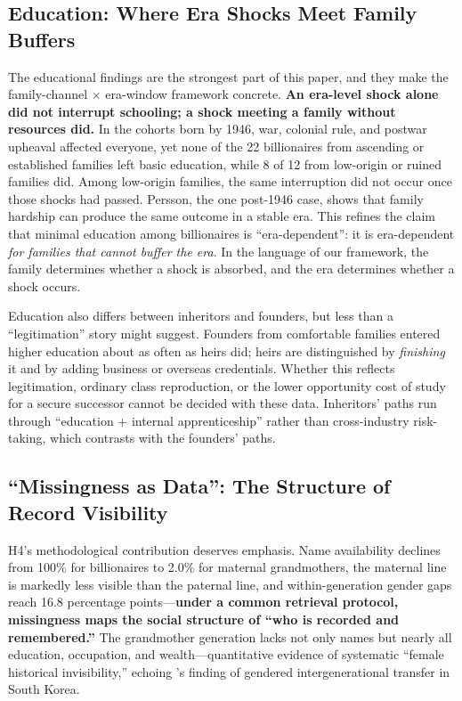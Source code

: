 \documentclass[11pt,a4paper]{article}
\begin{document}
\subsection{Education: Where Era Shocks Meet Family Buffers}

The educational findings are the strongest part of this paper, and they make the family-channel $\times$ era-window framework concrete. \textbf{An era-level shock alone did not interrupt schooling; a shock meeting a family without resources did.} In the cohorts born by 1946, war, colonial rule, and postwar upheaval affected everyone, yet none of the 22 billionaires from ascending or established families left basic education, while 8 of 12 from low-origin or ruined families did. Among low-origin families, the same interruption did not occur once those shocks had passed. Persson, the one post-1946 case, shows that family hardship can produce the same outcome in a stable era. This refines the claim that minimal education among billionaires is ``era-dependent'': it is era-dependent \emph{for families that cannot buffer the era}. In the language of our framework, the family determines whether a shock is absorbed, and the era determines whether a shock occurs.

Education also differs between inheritors and founders, but less than a ``legitimation'' story might suggest. Founders from comfortable families entered higher education about as often as heirs did; heirs are distinguished by \emph{finishing} it and by adding business or overseas credentials. Whether this reflects legitimation, ordinary class reproduction, or the lower opportunity cost of study for a secure successor cannot be decided with these data. Inheritors' paths run through ``education + internal apprenticeship'' rather than cross-industry risk-taking, which contrasts with the founders' paths.

\subsection{``Missingness as Data'': The Structure of Record Visibility}

H4's methodological contribution deserves emphasis. Name availability declines from 100\% for billionaires to 2.0\% for maternal grandmothers, the maternal line is markedly less visible than the paternal line, and within-generation gender gaps reach 16.8 percentage points---\textbf{under a common retrieval protocol, missingness maps the social structure of ``who is recorded and remembered.''} The grandmother generation lacks not only names but nearly all education, occupation, and wealth---quantitative evidence of systematic ``female historical invisibility,'' echoing \citet{kim2025}'s finding of gendered intergenerational transfer in South Korea.
\end{document}
